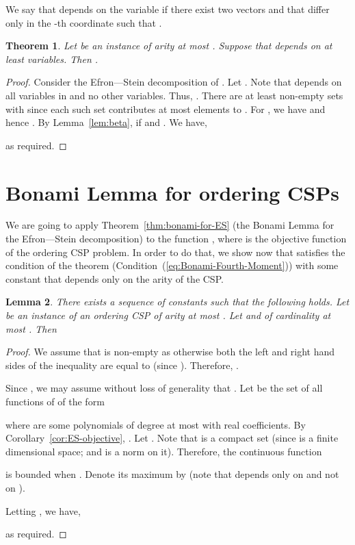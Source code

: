 \documentclass[11pt]{article}
\newif\ifconf
\newtheorem{theorem}{Theorem}
\newtheorem{lemma}[theorem]{Lemma}
\begin{document}
We say that  depends on the variable  if there exist two vectors  and  that differ only in the -th
coordinate such that .

\begin{theorem}\label{thm:variance}
Let  be an instance of arity at most . Suppose that  depends on
at least  variables. Then  .
\end{theorem}
\begin{proof}
Consider the Efron---Stein decomposition of . Let
.
Note that  depends on all variables in  and no other variables. Thus, .
There are at least  non-empty sets  with  since each such set  contributes at most  elements to .
For , we have   and hence . By Lemma~\ref{lem:beta},
 if  and . We have,

\ifconf\else
as required.
\fi
\end{proof}

\section{Bonami Lemma for ordering CSPs}
We are going to apply Theorem~\ref{thm:bonami-for-ES} (the Bonami Lemma for the Efron---Stein decomposition) to the function , where  is the objective function of the ordering CSP problem. In order to do that, we show now that  satisfies the condition of the theorem
(Condition~(\ref{eq:Bonami-Fourth-Moment})) with some constant  that depends only on the arity of the CSP.

\begin{lemma}\label{lem:bound-on-C}
There exists a sequence of constants  such that the following holds. Let  be an instance of an ordering CSP of arity at most . Let  and  of cardinality at most . Then	

\end{lemma}
\begin{proof}
We assume that  is non-empty as otherwise both the left and right hand sides of the inequality are equal to 
(since ). Therefore, .

Since , we may assume without loss of generality that .
Let  be the set of all functions
of  of the form

where  are some polynomials of degree at most  with real coefficients. By Corollary~\ref{cor:ES-objective}, . Let . Note that  is
a compact set (since  is a finite dimensional space; and  is a norm on it). Therefore, the continuous
function

is bounded when . Denote its maximum by 
(note that  depends only on  and not on ).

Letting ,  we have,

as required.
\end{proof}
\end{document}
